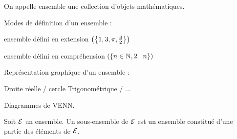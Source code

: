 \documentclass[12pt,twoside,a4paper]{article}
\author{MPSI 2}
\begin{document}
	\maketitle
	\begin{defi}
		On appelle ensemble une collection d'objets math\'ematiques.
		\begin{liste}
			\item Modes de d\'efinition d'un ensemble :
				\begin{liste}
					\item ensemble d\'efini en extension			$\left(\left\{1,3,\pi,\frac{3}{2}\right\}\right)$
					\item ensemble d\'efini en compr\'ehension		$\left(\left\{n\in\mathbb{N},2\mid n\right\}\right)$
				\end{liste}
			\item Repr\'esentation graphique d'un ensemble :
				\begin{liste}
					\item Droite r\'eelle / cercle Trigonom\'etrique / ...
					\item Diagrammes de VENN.
				\end{liste}
			\end{liste}
	\end{defi}
	\begin{defi}
		Soit $\mathcal{E}$ un ensemble. Un sous-ensemble de $\mathcal{E}$ est un ensemble constitu\'e d'une partie des \'el\'ements de $\mathcal{E}$.
	\end{defi}
\end{document}
